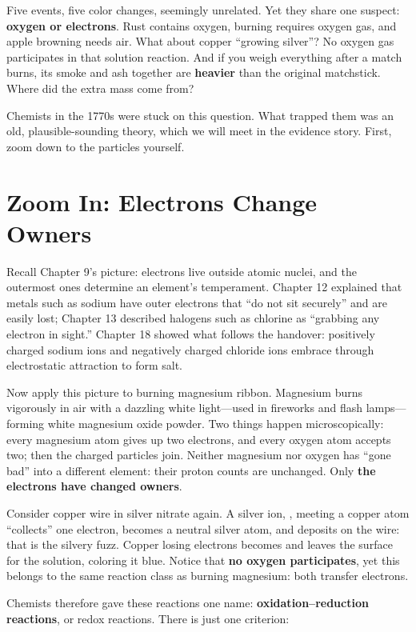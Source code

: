 Five events, five color changes, seemingly unrelated. Yet they share one suspect: \textbf{oxygen or electrons}. Rust contains oxygen, burning requires oxygen gas, and apple browning needs air. What about copper ``growing silver''? No oxygen gas participates in that solution reaction. And if you weigh everything after a match burns, its smoke and ash together are \textbf{heavier} than the original matchstick. Where did the extra mass come from?

Chemists in the 1770s were stuck on this question. What trapped them was an old, plausible-sounding theory, which we will meet in the evidence story. First, zoom down to the particles yourself.

\section{Zoom In: Electrons Change Owners}

Recall Chapter 9's picture: electrons live outside atomic nuclei, and the outermost ones determine an element's temperament. Chapter 12 explained that metals such as sodium have outer electrons that ``do not sit securely'' and are easily lost; Chapter 13 described halogens such as chlorine as ``grabbing any electron in sight.'' Chapter 18 showed what follows the handover: positively charged sodium ions and negatively charged chloride ions embrace through electrostatic attraction to form salt.

Now apply this picture to burning magnesium ribbon. Magnesium burns vigorously in air with a dazzling white light---used in fireworks and flash lamps---forming white magnesium oxide powder. Two things happen microscopically: every magnesium atom gives up two electrons, and every oxygen atom accepts two; then the charged particles join. Neither magnesium nor oxygen has ``gone bad'' into a different element: their proton counts are unchanged. Only \textbf{the electrons have changed owners}.

Consider copper wire in silver nitrate again. A silver ion, , meeting a copper atom ``collects'' one electron, becomes a neutral silver atom, and deposits on the wire: that is the silvery fuzz. Copper losing electrons becomes  and leaves the surface for the solution, coloring it blue. Notice that \textbf{no oxygen participates}, yet this belongs to the same reaction class as burning magnesium: both transfer electrons.

Chemists therefore gave these reactions one name: \textbf{oxidation--reduction reactions}, or redox reactions. There is just one criterion:

